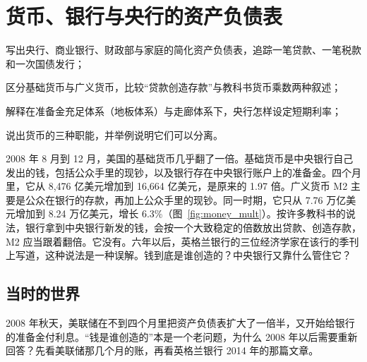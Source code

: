 \chapter{货币、银行与央行的资产负债表}\label{ch:money}

\begin{chapterguide}
\begin{guidegoals}
\item 写出央行、商业银行、财政部与家庭的简化资产负债表，追踪一笔贷款、一笔税款和一次国债发行；
\item 区分基础货币与广义货币，比较“贷款创造存款”与教科书货币乘数两种叙述；
\item 解释在准备金充足体系（地板体系）与走廊体系下，央行怎样设定短期利率；
\item 说出货币的三种职能，并举例说明它们可以分离。
\end{guidegoals}
\end{chapterguide}

2008 年 8 月到 12 月，美国的基础货币几乎翻了一倍。基础货币是中央银行自己发出的钱，包括公众手里的现钞，以及银行存在中央银行账户上的准备金。四个月里，它从 8,476 亿美元增加到 16,664 亿美元，是原来的 1.97 倍。广义货币 M2 主要是公众在银行的存款，再加上公众手里的现钞。同一时期，它只从 7.76 万亿美元增加到 8.24 万亿美元，增长 6.3\%（图~\ref{fig:money_mult}）\cite{fred2026m}。按许多教科书的说法，银行拿到中央银行新发的钱，会按一个大致稳定的倍数放出贷款、创造存款，M2 应当跟着翻倍。它没有。六年以后，英格兰银行的三位经济学家在该行的季刊上写道，这种说法是一种误解。钱到底是谁创造的？中央银行又靠什么管住它？

\section{当时的世界}\label{sec:money-world}

2008 年秋天，美联储在不到四个月里把资产负债表扩大了一倍半，又开始给银行的准备金付利息。“钱是谁创造的”本是一个老问题，为什么 2008 年以后需要重新回答？先看美联储那几个月的账，再看英格兰银行 2014 年的那篇文章。

